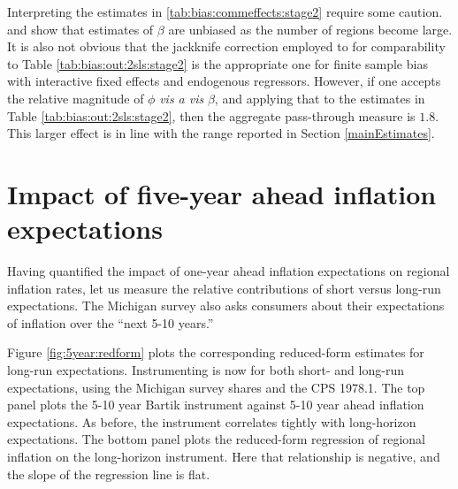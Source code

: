 \documentclass[12pt]{article}
\begin{document}
Interpreting the estimates in \ref{tab:bias:commeffects:stage2} require some caution.  \cite{Pesaran:2006} and \cite{HardingLamarche:EL} show that estimates of $\beta$ are unbiased as the number of regions become large.  It is also not obvious that the jackknife correction employed to for comparability to Table \ref{tab:bias:out:2sls:stage2} is the appropriate one for finite sample bias with interactive fixed effects and endogenous regressors.  However, if one accepts the relative magnitude of $\phi$ \emph{vis a vis} $\beta$, and applying that to the estimates in Table \ref{tab:bias:out:2sls:stage2}, then the aggregate pass-through measure is $1.8$.  This larger effect is in line with the range reported in Section \ref{mainEstimates}.



\section{Impact of five-year ahead inflation expectations}


Having quantified the impact of one-year ahead inflation expectations on regional inflation rates, let us measure the relative contributions of short versus long-run expectations. The Michigan survey also asks consumers about their expectations of inflation over the ``next 5-10 years.'' 

Figure \ref{fig:5year:redform} plots the corresponding reduced-form estimates for long-run expectations. Instrumenting is now for both short- and long-run expectations, using the Michigan survey shares and the CPS 1978.1. The top panel plots the 5-10 year Bartik instrument against 5-10 year ahead inflation expectations. As before, the instrument correlates tightly with long-horizon expectations. The bottom panel plots the reduced-form regression of regional inflation on the long-horizon instrument. Here that relationship is negative, and the slope of the regression line is flat.  
\end{document}
